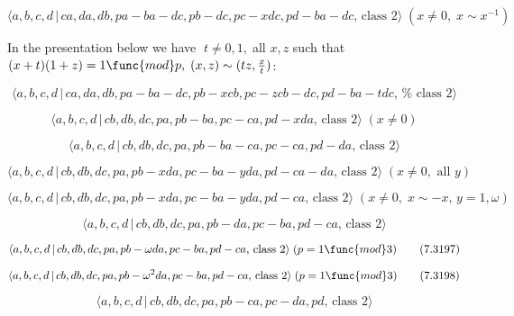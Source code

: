 \documentclass[10pt]{article}
\begin{document}
\begin{equation}
\langle a,b,c,d\,|\,ca,da,db,pa-ba-dc,pb-dc,pc-xdc,pd-ba-dc,\,\text{class }%
2\rangle \;(x\neq 0,\;x\sim x^{-1})  \tag{7.3190}
\end{equation}

In the presentation below we have $\;t\neq 0,1,\;$all $x,z$ such that $%
(x+t)(1+z)=1\func{mod}p,\;(x,z)\sim (tz,\frac{x}{t})$:

\begin{equation}
\langle a,b,c,d\,|\,ca,da,db,pa-ba-dc,pb-xcb,pc-zcb-dc,pd-ba-tdc,\,\text{%
class }2\rangle  \tag{7.3191}
\end{equation}

\begin{equation}
\langle a,b,c,d\,|\,cb,db,dc,pa,pb-ba,pc-ca,pd-xda,\,\text{class }2\rangle
\;(x \neq 0)  \tag{7.3192}
\end{equation}

\begin{equation}
\langle a,b,c,d\,|\,cb,db,dc,pa,pb-ba-ca,pc-ca,pd-da,\,\text{class }2\rangle
\tag{7.3193}
\end{equation}

\begin{equation}
\langle a,b,c,d\,|\,cb,db,dc,pa,pb-xda,pc-ba-yda,pd-ca-da,\,\text{class }%
2\rangle \;(x\neq 0,\text{ all }y)  \tag{7.3194}
\end{equation}

\begin{equation}
\langle a,b,c,d\,|\,cb,db,dc,pa,pb-xda,pc-ba-yda,pd-ca,\,\text{class }%
2\rangle \;(x\neq 0,\;x\sim -x,\,y=1,\omega )  \tag{7.3195}
\end{equation}

\begin{equation}
\langle a,b,c,d\,|\,cb,db,dc,pa,pb-da,pc-ba,pd-ca,\,\text{class }2\rangle 
\tag{7.3196}
\end{equation}

\begin{equation}
\langle a,b,c,d\,|\,cb,db,dc,pa,pb-\omega da,pc-ba,pd-ca,\,\text{class }%
2\rangle \;(p=1\func{mod}3)  \tag{7.3197}
\end{equation}

\begin{equation}
\langle a,b,c,d\,|\,cb,db,dc,pa,pb-\omega ^{2}da,pc-ba,pd-ca,\,\text{class }%
2\rangle \;(p=1\func{mod}3)  \tag{7.3198}
\end{equation}

\begin{equation}
\langle a,b,c,d\,|\,cb,db,dc,pa,pb-ca,pc-da,pd,\,\text{class }2\rangle 
\tag{7.3199}
\end{equation}
\end{document}
